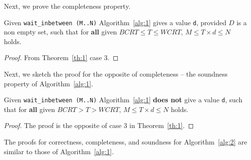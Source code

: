 Next, we prove the completeness property.
\begin{theorem}
  Given \texttt{wait\_inbetween (M..N)} Algorithm~\ref{alg:1} gives a
  value \texttt{d}, provided $D$ is a non empty set, such that for
  \textbf{all} given $BCRT \leq T \leq WCRT$, $M \leq T \times d \leq N$
  holds.
\end{theorem}
\begin{proof}
  From Theorem~\ref{th:1} case 3.
\end{proof}

Next, we sketch the proof for the opposite of completeness -- the
soundness property of Algorithm~\ref{alg:1}.

\begin{theorem}
  Given \texttt{wait\_inbetween (M..N)} Algorithm~\ref{alg:1}
  \textbf{does not} give a value \texttt{d}, such that for \textbf{all}
  given $BCRT > T > WCRT$, $M \leq T \times d \leq N$ holds.
\end{theorem}

\begin{proof}
  The proof is the opposite of case 3 in Theorem~\ref{th:1}.
\end{proof}

The proofs for correctness, completeness, and soundness for
Algorithm~\ref{alg:2} are similar to those of Algorithm~\ref{alg:1}.


